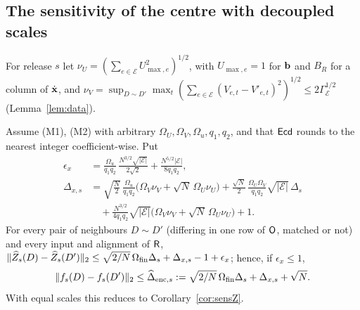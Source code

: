 \subsection{The sensitivity of the centre with decoupled scales}

For release $s$ let $\nu_U=(\sum_{e\in\mathcal E}U_{\max,e}^2)^{1/2}$, with $U_{\max,e}=1$ for $\mathbf{b}$ and $B_R$ for a column of $\dot{\mathbf{x}}$, and $\nu_V=\sup_{D\sim D'}\max_t(\sum_{e\in\mathcal E}(V_{e,t}-V'_{e,t})^2)^{1/2}\le2\Gamma_{\mathcal E}^{1/2}$ (Lemma~\ref{lem:data}).

\begin{lemma}\label{lem:sensZdec}
Assume (M1), (M2) with arbitrary $\Omega_U,\Omega_V,\Omega_u,q_1,q_2$, and that $\mathsf{Ecd}$ rounds to the nearest integer coefficient-wise. Put
\begin{align*}
  \epsilon_x&=\frac{\Omega_u}{q_1q_2}\,\frac{N^{3/2}\sqrt{|\mathcal E|}}{2\sqrt2}+\frac{N^{5/2}|\mathcal E|}{8q_1q_2},\\
  \Delta_{x,s}&=\sqrt{\tfrac N2}\,\frac{\Omega_u}{q_1q_2}\bigl(\Omega_V\nu_V+\sqrt N\,\Omega_U\nu_U\bigr)
  +\frac{\sqrt N}{2}\,\frac{\Omega_U\Omega_V}{q_1q_2}\sqrt{|\mathcal E|}\,\Delta_s\\
  &\quad+\frac{N^{3/2}}{4q_1q_2}\sqrt{|\mathcal E|}\bigl(\Omega_V\nu_V+\sqrt N\,\Omega_U\nu_U\bigr)+1 .
\end{align*}
For every pair of neighbours $D\sim D'$ (differing in one row of $\mathsf{O}$, matched or not) and every input and alignment of $\mathsf{R}$, $\lVert \widehat Z_s(D)-\widehat Z_s(D')\rVert_2\le\sqrt{2/N}\,\Omega_{\mathrm{fin}}\Delta_s+\Delta_{x,s}-1+\epsilon_x$; hence, if $\epsilon_x\le1$,
\[
  \lVert f_s(D)-f_s(D')\rVert_2\le\widehat\Delta_{\mathrm{enc},s}:=\sqrt{2/N}\,\Omega_{\mathrm{fin}}\Delta_s+\Delta_{x,s}+\sqrt N .
\]
With equal scales this reduces to Corollary~\ref{cor:sensZ}.
\end{lemma}
